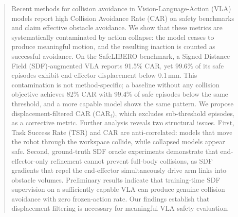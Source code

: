 \begin{abstract}
Recent methods for collision avoidance in Vision-Language-Action (VLA) models report high Collision Avoidance Rate (CAR) on safety benchmarks and claim effective obstacle avoidance. We show that these metrics are systematically contaminated by action collapse: the model ceases to produce meaningful motion, and the resulting inaction is counted as successful avoidance. On the SafeLIBERO benchmark, a Signed Distance Field (SDF)-augmented VLA reports 91.5\% CAR, yet 99.6\% of its safe episodes exhibit end-effector displacement below 0.1\,mm. This contamination is not method-specific; a baseline without any collision objective achieves 82\% CAR with 99.4\% of safe episodes below the same threshold, and a more capable model shows the same pattern. We propose displacement-filtered CAR (CAR$_\text{f}$), which excludes sub-threshold episodes, as a corrective metric. Further analysis reveals two structural issues. First, Task Success Rate (TSR) and CAR are anti-correlated: models that move the robot through the workspace collide, while collapsed models appear safe. Second, ground-truth SDF oracle experiments demonstrate that end-effector-only refinement cannot prevent full-body collisions, as SDF gradients that repel the end-effector simultaneously drive arm links into obstacle volumes. Preliminary results indicate that training-time SDF supervision on a sufficiently capable VLA can produce genuine collision avoidance with zero frozen-action rate. Our findings establish that displacement filtering is necessary for meaningful VLA safety evaluation.
\end{abstract}
